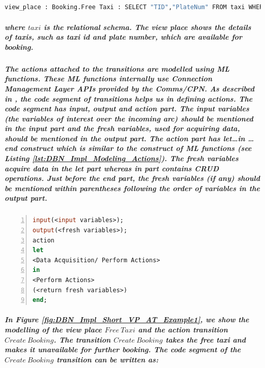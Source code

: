 \subparagraph*{}
\begin{lstlisting}[showstringspaces=false, language = ML, caption = View place declaration example: $\mathit{Free\ Taxi}$, captionpos=b]
view_place : Booking.Free Taxi : SELECT "TID","PlateNum" FROM taxi WHERE "isFree" = TRUE;
\end{lstlisting}

\subparagraph*{\textnormal{where $\mathit{taxi}$ is the relational schema. The view place shows the details of taxis, such as taxi id and plate number, which are available for booking.}}

\subparagraph*{\textnormal{The actions attached to the transitions are modelled using ML functions. These ML functions internally use Connection Management Layer APIs provided by the Comms/CPN. As described in \cite{CPN_Tools_CodeSegment}, the code segment of transitions helps us in defining actions. The code segment has \textit{input}, \textit{output} and \textit{action} part. The input variables (the variables of interest over the incoming arc) should be mentioned in the \textit{input} part and the fresh variables, used for acquiring data, should be mentioned in the \textit{output} part. The \textit{action} part has \textit{let\ldots in \ldots end} construct which is similar to the construct of ML functions (see Listing \ref{lst:DBN_Impl_Modeling_Actions}). The fresh variables acquire data in the \textit{let} part whereas \textit{in} part contains CRUD operations. Just before the \textit{end} part, the fresh variables (if any) should be mentioned within parentheses following the order of variables in the \textit{output} part.}}

\subparagraph*{}
\begin{lstlisting}[showstringspaces=false, language = ML, caption = Code Segment: action transition, captionpos=b, label = lst:DBN_Impl_Modeling_Actions, numbers=left,
stepnumber=1]
input(<input variables>);
output(<fresh variables>);
action
let
<Data Acquisition/ Perform Actions>
in
<Perform Actions>
(<return fresh variables>)
end;
\end{lstlisting}

\subparagraph*{\textnormal{In Figure \ref{fig:DBN_Impl_Short_VP_AT_Example1}, we show the modelling of the view place $\mathit{Free\ Taxi}$ and the action transition $\mathit{Create\ Booking}$. The transition $\mathit{Create\ Booking}$ takes the free taxi and makes it unavailable for further booking. The code segment of the $\mathit{Create\ Booking}$ transition can be written as:}}

